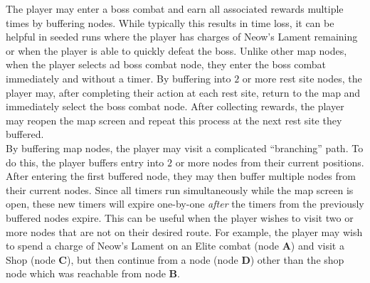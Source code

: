 \documentclass[12pt]{amsart}
\begin{document}
The player may enter a boss combat and earn all associated rewards multiple times by buffering nodes.  
While typically this results in time loss, it can be helpful in seeded runs where the player has charges of Neow's Lament remaining or when the player is able to quickly defeat the boss.  
Unlike other map nodes, when the player selects ad boss combat node, they enter the boss combat immediately and without a timer.  
By buffering into $2$ or more rest site nodes, the player may, after completing their action at each rest site, return to the map and immediately select the boss combat node.  
After collecting rewards, the player may reopen the map screen and repeat this process at the next rest site they buffered.  
\\

By buffering map nodes, the player may visit a complicated ``branching'' path.  
To do this, the player buffers entry into $2$ or more nodes from their current positions.  
After entering the first buffered node, they may then buffer multiple nodes from their current nodes.  
Since all timers run simultaneously while the map screen is open, these new timers will expire one-by-one \textit{after} the timers from the previously buffered nodes expire.  
This can be useful when the player wishes to visit two or more nodes that are not on their desired route.  
For example, the player may wish to spend a charge of Neow's Lament on an Elite combat (node \textbf{A}) and visit a Shop (node \textbf{C}), but then continue from a node (node \textbf{D}) other than the shop node which was reachable from node \textbf{B}.  \\
\end{document}
